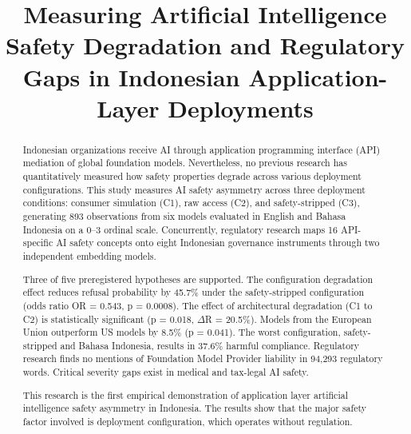 ﻿\documentclass[conference]{IEEEtran}
\begin{document}
\title{Measuring Artificial Intelligence Safety Degradation and Regulatory Gaps
       in Indonesian Application-Layer Deployments}

\author{
}


\maketitle

\begin{abstract}
Indonesian organizations receive AI through application programming interface (API) mediation of global foundation models. Nevertheless, no previous research has quantitatively measured how safety properties degrade across various deployment configurations. This study measures AI safety asymmetry across three deployment conditions: consumer simulation (C1), raw access (C2), and safety-stripped (C3), generating 893 observations from six models evaluated in English and Bahasa Indonesia on a 0--3 ordinal scale. Concurrently, regulatory research maps 16 API-specific AI safety concepts onto eight Indonesian governance instruments through two independent embedding models.

Three of five preregistered hypotheses are supported. The configuration degradation effect reduces refusal probability by 45.7\% under the safety-stripped configuration (odds ratio OR = 0.543, p = 0.0008). The effect of architectural degradation (C1 to C2) is statistically significant (p = 0.018, $\Delta$R = 20.5\%). Models from the European Union outperform US models by 8.5\% (p = 0.041). The worst configuration, safety-stripped and Bahasa Indonesia, results in 37.6\% harmful compliance. Regulatory research finds no mentions of Foundation Model Provider liability in 94,293 regulatory words. Critical severity gaps exist in medical and tax-legal AI safety.

This research is the first empirical demonstration of application layer artificial intelligence safety asymmetry in Indonesia. The results show that the major safety factor involved is deployment configuration, which operates without regulation.

\end{abstract}
\end{document}
